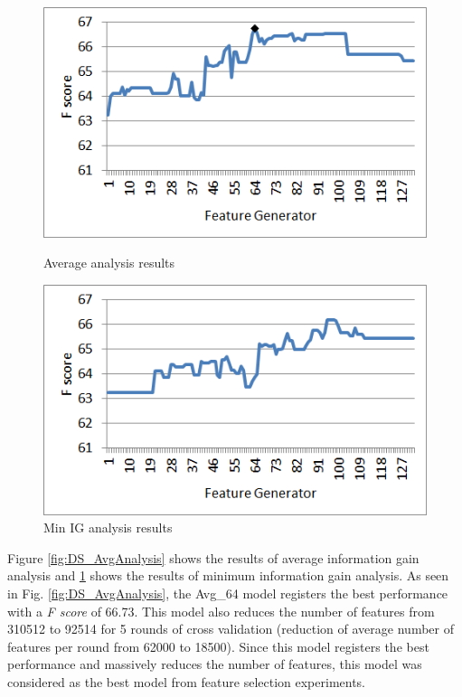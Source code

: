 \begin{figure}
\centering
\begin{minipage}{.5\textwidth}
  \centering
  \includegraphics[width=.95\textwidth]{figures/DSAvgAnalysis.png}
  \caption{Average analysis results}
  \label{fig:DS_AvgAnalysis}
\end{minipage}%
\begin{minipage}{.5\textwidth}
  \centering
  \includegraphics[width=.95\textwidth]{figures/DSMinAnalysis.png}
  \caption{Min IG analysis results}
  \label{fig:DS_MinAnalysis}
\end{minipage}
\end{figure}

Figure \ref{fig:DS_AvgAnalysis} shows the results of average information gain analysis and \ref{fig:DS_MinAnalysis} shows the results of minimum information gain analysis. As seen in Fig. \ref{fig:DS_AvgAnalysis}, the Avg\_64 model registers the best performance with a \textit{F score} of 66.73. This model also reduces the number of features from 310512 to 92514 for 5 rounds of cross validation (reduction of average number of features per round from 62000 to 18500). Since this model registers the best performance and massively reduces the number of features, this model was considered as the best model from feature selection experiments.

